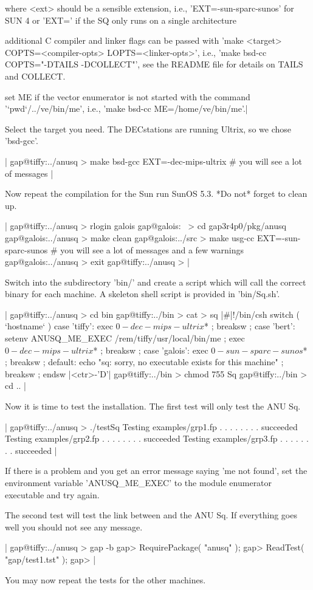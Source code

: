    where <ext> should be a sensible extension, i.e.,
   'EXT=-sun-sparc-sunos' for SUN 4 or 'EXT=' if the SQ only
   runs on a single architecture

   additional C compiler and linker flags can be passed with
   'make <target> COPTS=<compiler-opts> LOPTS=<linker-opts>',
   i.e., 'make bsd-cc COPTS="-DTAILS -DCOLLECT"', see the
   README file for details on TAILS and COLLECT.

   set ME if the vector enumerator is not started with the 
   command '`pwd`/../ve/bin/me',
   i.e., 'make bsd-cc ME=/home/ve/bin/me'.|

Select  the target you  need.  The DECstations  are running Ultrix, so we
chose 'bsd-gcc'.

|    gap@tiffy:../anusq > make bsd-gcc EXT=-dec-mips-ultrix
    # you will see a lot of messages |

Now repeat the compilation for the Sun run SunOS  5.3. *Do not* forget to
clean up.

|    gap@tiffy:../anusq > rlogin galois
    gap@galois:~ > cd gap3r4p0/pkg/anusq
    gap@galois:../anusq > make clean
    gap@galois:../src > make usg-cc EXT=-sun-sparc-sunos
    # you will see a lot of messages and a few warnings
    gap@galois:../anusq > exit
    gap@tiffy:../anusq > |

Switch into the subdirectory 'bin/'  and create a  script which will call
the correct binary for each machine. A skeleton  shell script is provided
in 'bin/Sq.sh'.

|    gap@tiffy:../anusq > cd bin
    gap@tiffy:../bin > cat > sq
    |\#|!/bin/csh
    switch ( `hostname` )
      case 'tiffy':
        exec $0-dec-mips-ultrix $* ;
        breaksw ;
      case 'bert':
        setenv ANUSQ_ME_EXEC /rem/tiffy/usr/local/bin/me ;
        exec $0-dec-mips-ultrix $* ;
        breaksw ;
      case 'galois':
        exec $0-sun-sparc-sunos $* ;
        breaksw ;
      default:
        echo "sq: sorry, no executable exists for this machine" ;
        breaksw ;
    endsw
    |<ctr>-'D'|
    gap@tiffy:../bin > chmod 755 Sq
    gap@tiffy:../bin > cd .. |

Now it is time to test  the installation.  The  first test will only test
the ANU Sq.

|    gap@tiffy:../anusq > ./testSq
    Testing examples/grp1.fp  . . . . . . . . succeeded
    Testing examples/grp2.fp  . . . . . . . . succeeded
    Testing examples/grp3.fp  . . . . . . . . succeeded |

If there is a problem  and you get an error message saying 'me not found',
set the  environment variable 'ANUSQ\_ME\_EXEC'  to the module enumerator
executable and try again.

The  second test will  test the link between {\GAP}   and the ANU Sq.  If
everything goes well you should not see any message.

|    gap@tiffy:../anusq > gap -b
    gap> RequirePackage( "anusq" );
    gap> ReadTest( "gap/test1.tst" );
    gap> |

You may now repeat the tests for the other machines.
